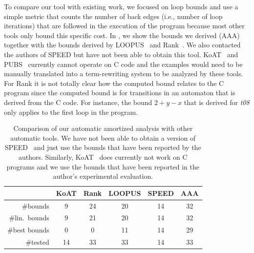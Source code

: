 \documentclass[nocopyrightspace,preprint]{sigplanconf}
\newcommand{\pref}[1]{\prettyref{#1}}
\begin{document}
To compare our tool with existing work, we focused on loop bounds and
use a simple metric that counts the number of back edges (i.e., number
of loop iterations) that are followed in the execution of the program
because most other tools only bound this specific cost. In
\pref{fig:compar}, we show the bounds we derived (AAA) together with
the bounds derived by LOOPUS~\cite{SinnZV14} and
Rank~\cite{AliasDFG10}.  We also contacted the authors of SPEED but
have not been able to obtain this tool.
KoAT~\cite{BrockschmidtEFFG14} and PUBS~\cite{AlbertAGPZ12} currently
cannot operate on C code and the examples would need to be manually
translated into a term-rewriting system to be analyzed by these tools.  For
Rank it is not totally clear how the computed bound relates to the C
program since the computed bound is for transitions in an automaton
that is derived from the C code.  For instance, the bound $2+y-x$ that
is derived for \emph{t08} only applies to the first loop in the
program.

\begin{table}[t]
\centering
\begin{tabular}{r|c|c|c|c|c}
& KoAT & Rank & LOOPUS & SPEED & AAA \\
\hline
\#bounds & 9 & 24 & 20 & 14 & 32
\\
\#lin.\ bounds & 9 & 21 & 20 & 14 & 32
\\
\#best bounds & 0 & 0 & 11 & 14 & 29
\\
\#tested & 14 & 33 & 33 & 14 & 33
\end{tabular}
\vspace{.1cm}
\caption{Comparison of our automatic amortized analysis with other
  automatic tools.  We have not been able to obtain a version of
  SPEED~\cite{GulwaniMC09} and just use the bounds that have been
  reported by the authors. Similarly, KoAT~\cite{BrockschmidtEFFG14}
  does currently not work on C programs and we use the bounds that
  have been reported in the author's experimental evaluation.}
\label{tab:compar}
\end{table}
\end{document}
